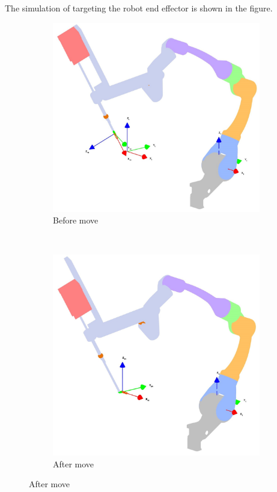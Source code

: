 \documentclass{article}
\begin{document}
The simulation of targeting the robot end effector is shown in the figure.
\begin{figure}
    \centering
    \begin{subfigure}[b]{0.454\textwidth}
        \includegraphics[width=\textwidth]{before_move}
        \caption{Before move}
        \label{fig:before_move}
    \end{subfigure}
	~
    \begin{subfigure}[b]{0.45\textwidth}
        \includegraphics[width=\textwidth]{after_move}
        \caption{After move}
        \label{fig:after_move}
    \end{subfigure}
\end{figure}
\end{document}
